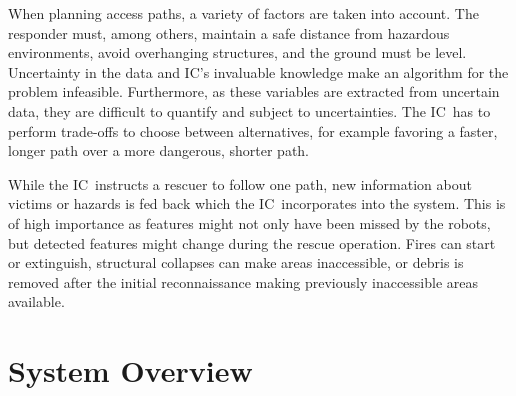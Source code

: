 \documentclass[conference,10pt,letter]{IEEEtran}
\def\IC{IC}
\begin{document}
When planning access paths, a variety of factors are taken into account. The responder must, among others, maintain a safe distance from hazardous environments, avoid overhanging structures, and the ground must be level. Uncertainty in the data and \IC 's invaluable knowledge make an algorithm for the problem infeasible. Furthermore, as these variables are extracted from uncertain data, they are difficult to quantify and subject to uncertainties. The \IC\ has to perform trade-offs to choose between alternatives, for example favoring a faster, longer path over a more dangerous, shorter path.

While the \IC\ instructs a rescuer to follow one path, new information about victims or hazards is fed back which the \IC\ incorporates into the system. This is of high importance as features might not only have been missed by the robots, but detected features might change during the rescue operation. Fires can start or extinguish, structural collapses can make areas inaccessible, or debris is removed after the initial reconnaissance making previously inaccessible areas available. 


\section{System Overview} \label{sec:overview}
%
%
\end{document}
